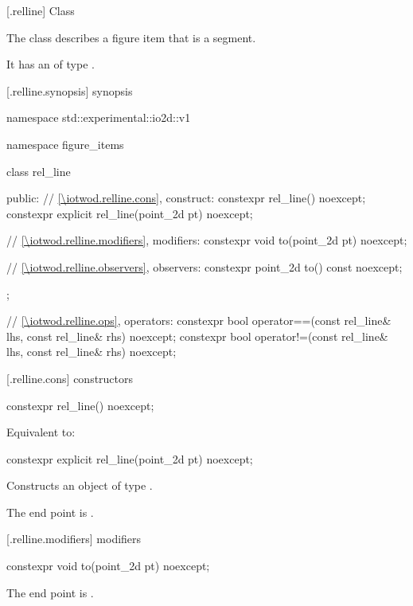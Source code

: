  [\iotwod.relline] {Class }

\pnum
{}%
The class  describes a figure item that is a segment.

\pnum
It has an  of type .

 [\iotwod.relline.synopsis] { synopsis}

\begin{codeblock}
namespace std::experimental::io2d::v1 {
  namespace figure_items {
    class rel_line {
    public:
      // \ref{\iotwod.relline.cons}, construct:
      constexpr rel_line() noexcept;
      constexpr explicit rel_line(point_2d pt) noexcept;

      // \ref{\iotwod.relline.modifiers}, modifiers:
      constexpr void to(point_2d pt) noexcept;

      // \ref{\iotwod.relline.observers}, observers:
      constexpr point_2d to() const noexcept;
    };
    
    // \ref{\iotwod.relline.ops}, operators:
    constexpr bool operator==(const rel_line& lhs, const rel_line& rhs) 
      noexcept;
    constexpr bool operator!=(const rel_line& lhs, const rel_line& rhs) 
      noexcept;
  }
}
\end{codeblock}

 [\iotwod.relline.cons] { constructors}

%
\begin{itemdecl}
constexpr rel_line() noexcept;
\end{itemdecl}
\begin{itemdescr}
\pnum
\effects
Equivalent to: 
\end{itemdescr}

%
\begin{itemdecl}
constexpr explicit rel_line(point_2d pt) noexcept;
\end{itemdecl}
\begin{itemdescr}
\pnum
\effects
Constructs an object of type .

\pnum
The end point is .
\end{itemdescr}

 [\iotwod.relline.modifiers]{ modifiers}

\begin{itemdecl}
constexpr void to(point_2d pt) noexcept;
\end{itemdecl}
\begin{itemdescr}
\pnum
\effects
The end point is .
\end{itemdescr}

